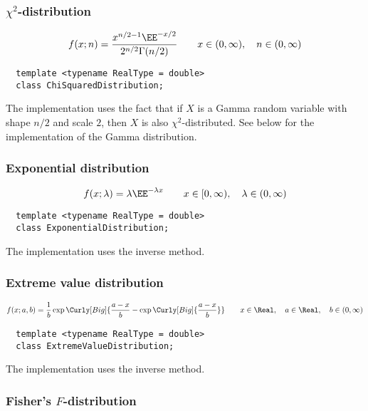 \subsubsection{$\chi^2$-distribution}

\begin{equation*}
  f(x;n) = \frac{x^{n/2 - 1}\EE^{-x/2}}{2^{n/2}\Gamma(n/2)} \qquad
  x \in (0,\infty),\quad n \in (0,\infty)
\end{equation*}
\begin{Verbatim}
  template <typename RealType = double>
  class ChiSquaredDistribution;
\end{Verbatim}
The implementation uses the fact that if $X$ is a Gamma random variable with
shape $n / 2$ and scale $2$, then $X$ is also $\chi^2$-distributed. See below
for the implementation of the Gamma distribution.

\subsubsection{Exponential distribution}

\begin{equation*}
  f(x;\lambda) = \lambda\EE^{-\lambda x} \qquad
  x \in [0,\infty),\quad \lambda \in (0,\infty)
\end{equation*}
\begin{Verbatim}
  template <typename RealType = double>
  class ExponentialDistribution;
\end{Verbatim}
The implementation uses the inverse method.

\subsubsection{Extreme value distribution}

\begin{equation*}
  f(x;a,b) =
  \frac{1}{b}\exp\Curly[Big]{
    \frac{a - x}{b} - \exp\Curly[Big]{\frac{a - x}{b}}} \qquad
  x \in \Real,\quad a \in \Real,\quad b \in (0, \infty)
\end{equation*}
\begin{Verbatim}
  template <typename RealType = double>
  class ExtremeValueDistribution;
\end{Verbatim}
The implementation uses the inverse method.

\subsubsection{Fisher's $F$-distribution}

